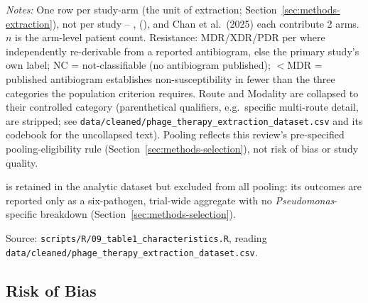 \begin{table}[htbp]
\centering
\scriptsize
\setlength{\tabcolsep}{3.5pt}
\begin{threeparttable}
\caption{Study characteristics, all \PrismaIncludedArms extracted study-arms}
\label{tab:study-characteristics}

\begin{tablenotes}\footnotesize
\item \textit{Notes:} One row per study-arm (the unit of extraction; Section~\ref{sec:methods-extraction}), not per study -- \textcite{Liu2025_mlife_perinephric}, \citeauthor{Aslam2019_ajt} (\citeyear{Aslam2019_ajt}), and Chan et al.\ (2025) each contribute 2 arms. $n$ is the arm-level patient count. Resistance: MDR/XDR/PDR per \textcite{Magiorakos2012_mdrxdr} where independently re-derivable from a reported antibiogram, else the primary study's own label; NC = not-classifiable (no antibiogram published); $<$MDR = published antibiogram establishes non-susceptibility in fewer than the three categories the population criterion requires. Route and Modality are collapsed to their controlled category (parenthetical qualifiers, e.g.\ specific multi-route detail, are stripped; see \texttt{data/cleaned/phage\_therapy\_extraction\_dataset.csv} and its codebook for the uncollapsed text). Pooling reflects this review's pre-specified pooling-eligibility rule (Section~\ref{sec:methods-selection}), not risk of bias or study quality.
\item[a] \textcite{Leitner2021_lancetid_pyophage} is retained in the analytic dataset but excluded from all pooling: its outcomes are reported only as a six-pathogen, trial-wide aggregate with no \textit{Pseudomonas}-specific breakdown (Section~\ref{sec:methods-selection}).
\item Source: \texttt{scripts/R/09\_table1\_characteristics.R}, reading \texttt{data/cleaned/phage\_therapy\_extraction\_dataset.csv}.
\end{tablenotes}
\end{threeparttable}
\end{table}

\subsection{Risk of Bias}
\label{sec:results-rob}

